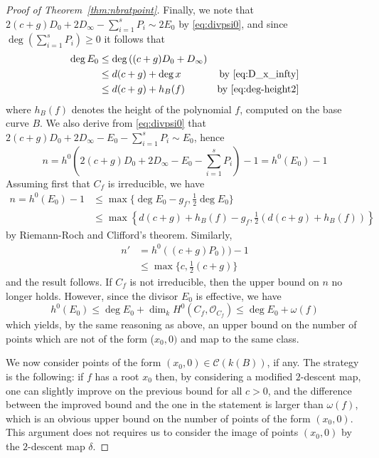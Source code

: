 \documentclass[11pt]{article}
\theoremstyle{plain}
\theoremstyle{definition}
\begin{document}
\begin{proof}[Proof of Theorem~\ref{thm:nbratpoint}]
Finally, we note that $2(c+g)D_0 + 2D_\infty -\sum_{i=1}^sP_i\sim 2E_0$ by \eqref{eq:divpsi0}, and since $\deg(\sum_{i=1}^sP_i)\geq 0$ it follows that
\begin{align*}
\deg E_0 &\leq \deg\left((c+g)D_0 + D_\infty\right) \\
        &\leq d(c+g)+\deg x & \text{by \eqref{eq:D_x_infty}} \\
        &\leq d(c+g)+ h_B(f) & \text{by \eqref{eq:deg-height2}}
\end{align*}
where $h_B(f)$ denotes the height of the polynomial $f$, computed on the base curve $B$. We also derive from \eqref{eq:divpsi0} that $2(c+g)D_0 + 2D_\infty -E_0-\sum_{i=1}^sP_i\sim E_0$, hence
$$
n=h^0(2(c+g)D_0 + 2D_\infty -E_0-\sum_{i=1}^sP_i)-1=h^0(E_0)-1
$$
Assuming first that $C_f$ is irreducible, we have
\begin{align*}
n=h^0(E_0)-1 &\leq \max\{\deg E_0-g_f, \frac{1}{2}\deg E_0\}\\
  &\leq \max\left\{d(c+g)+h_B(f)-g_f, \frac{1}{2}(d(c+g)+h_B(f))\right\}
\end{align*}
by Riemann-Roch and Clifford's theorem. Similarly,
\begin{align*}
n'&=h^0((c+g)P_0))-1 \\
&\leq \max\{c, \frac{1}{2}(c+g)\}
\end{align*}
and the result follows. If $C_f$ is not irreducible, then the upper bound on $n$ no longer holds. However, since the divisor $E_0$ is effective, we have \cite[\S{}7.3.2, Prop.~3.25]{liu}
$$
h^0(E_0) \leq \deg E_0 + \dim_k H^0(C_f,\mathcal{O}_{C_f}) \leq \deg E_0 + \omega(f)
$$
which yields, by the same reasoning as above, an upper bound on the number of points which are not of the form ($x_0,0)$ and map to the same class.

We now consider points of the form $(x_0,0) \in \mathcal{C}(k(B))$, if any. The strategy is the following: if $f$ has a root $x_0$ then, by considering a modified $2$-descent map, one can slightly improve on the previous bound for all $c>0$, and the difference between the improved bound and the one in the statement is larger than $\omega(f)$, which is an obvious upper bound on the number of points of the form $(x_0,0)$. This argument does not requires us to consider the image of points $(x_0,0)$ by the $2$-descent map $\delta$.


\end{proof}
\end{document}

